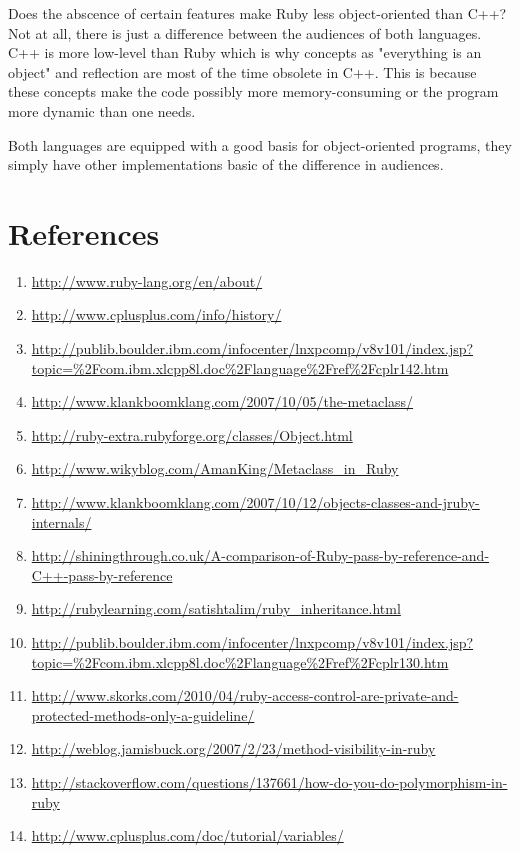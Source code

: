 \documentclass[10pt,a4paper,twocolumn]{article}
\begin{document}
Does the abscence of certain features make Ruby less object-oriented than C++? Not at all, there is just a difference between the audiences of both languages. C++ is more low-level than Ruby which is why concepts as "everything is an object" and reflection are most of the time obsolete in C++. This is because these concepts make the code possibly more memory-consuming or the program more dynamic than one needs.

Both languages are equipped with a good basis for object-oriented programs, they simply have other implementations basic of the difference in audiences.

\section{References}
\begin{enumerate}
\item \url{http://www.ruby-lang.org/en/about/}
\item \url{http://www.cplusplus.com/info/history/}
\item \url{http://publib.boulder.ibm.com/infocenter/lnxpcomp/v8v101/index.jsp?topic=\%2Fcom.ibm.xlcpp8l.doc\%2Flanguage\%2Fref\%2Fcplr142.htm}
\item \url{http://www.klankboomklang.com/2007/10/05/the-metaclass/}
\item \url{http://ruby-extra.rubyforge.org/classes/Object.html}
\item \url{http://www.wikyblog.com/AmanKing/Metaclass_in_Ruby}
\item \url{http://www.klankboomklang.com/2007/10/12/objects-classes-and-jruby-internals/}
\item \url{http://shiningthrough.co.uk/A-comparison-of-Ruby-pass-by-reference-and-C++-pass-by-reference}
\item \url{http://rubylearning.com/satishtalim/ruby_inheritance.html}
\item \url{http://publib.boulder.ibm.com/infocenter/lnxpcomp/v8v101/index.jsp?topic=\%2Fcom.ibm.xlcpp8l.doc\%2Flanguage\%2Fref\%2Fcplr130.htm}
\item \url{http://www.skorks.com/2010/04/ruby-access-control-are-private-and-protected-methods-only-a-guideline/}
\item \url{http://weblog.jamisbuck.org/2007/2/23/method-visibility-in-ruby}
\item \url{http://stackoverflow.com/questions/137661/how-do-you-do-polymorphism-in-ruby}
\item \url{http://www.cplusplus.com/doc/tutorial/variables/}

\end{enumerate}
\end{document}
